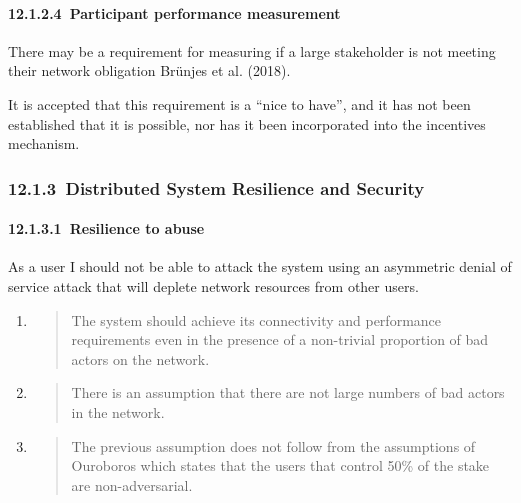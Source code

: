 \documentclass[]{article}
\let\oldparagraph\paragraph
\renewcommand{\paragraph}[1]{\oldparagraph{#1}\mbox{}}
\begin{document}
\hypertarget{participant-performance-measurement}{%
\paragraph{​12.1.2.4​~Participant performance measurement
}\label{participant-performance-measurement}}

There may be a requirement for measuring if a large stakeholder is not
meeting their network obligation Brünjes et al. (2018).

It is accepted that this requirement is a ``nice to have'', and it has
not been established that it is possible, nor has it been incorporated
into the incentives mechanism.

\hypertarget{distributed-system-resilience-and-security}{%
\subsubsection{​12.1.3​~Distributed System Resilience and
Security}\label{distributed-system-resilience-and-security}}

\hypertarget{resilience-to-abuse}{%
\paragraph{​12.1.3.1​~Resilience to abuse}\label{resilience-to-abuse}}

As a user I should not be able to attack the system using an asymmetric
denial of service attack that will deplete network resources from other
users.

\begin{enumerate}
\def\labelenumi{\arabic{enumi}.}
\item
  \begin{quote}
  The system should achieve its connectivity and performance
  requirements even in the presence of a non-trivial proportion of bad
  actors on the network.
  \end{quote}
\item
  \begin{quote}
  There is an assumption that there are not large numbers of bad actors
  in the network.
  \end{quote}
\item
  \begin{quote}
  The previous assumption does not follow from the assumptions of
  Ouroboros which states that the users that control 50\% of the stake
  are non-adversarial.
  \end{quote}
\end{enumerate}
\end{document}
